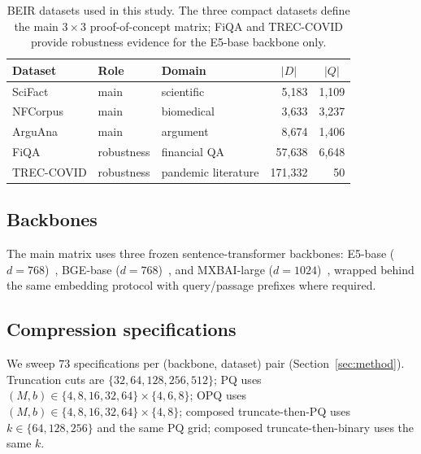 \documentclass[sigconf]{acmart}
\begin{document}
\begin{table}[t]
\centering
\small
\caption{BEIR datasets used in this study. The three compact datasets define the main 3\,$\times$\,3 proof-of-concept matrix; FiQA and TREC-COVID provide robustness evidence for the E5-base backbone only.}
\label{tab:datasets}
\begin{tabular}{lllrr}
\toprule
Dataset & Role & Domain & \multicolumn{1}{c}{$|D|$} & \multicolumn{1}{c}{$|Q|$} \\
\midrule
SciFact     & main       & scientific          & 5{,}183   & 1{,}109 \\
NFCorpus    & main       & biomedical          & 3{,}633   & 3{,}237 \\
ArguAna     & main       & argument            & 8{,}674   & 1{,}406 \\
\midrule
FiQA        & robustness & financial QA        & 57{,}638  & 6{,}648 \\
TREC-COVID  & robustness & pandemic literature & 171{,}332 & 50      \\
\bottomrule
\end{tabular}
\end{table}

\subsection{Backbones}
The main matrix uses three frozen sentence-transformer backbones: E5-base ($d{=}768$)~\cite{wang2022e5}, BGE-base ($d{=}768$)~\cite{xiao2023cpack}, and MXBAI-large ($d{=}1024$)~\cite{mxbai2024embed}, wrapped behind the same embedding protocol with query/passage prefixes where required.

\subsection{Compression specifications}
We sweep $73$ specifications per (backbone, dataset) pair (Section~\ref{sec:method}). Truncation cuts are $\{32, 64, 128, 256, 512\}$; PQ uses $(M, b) \in \{4, 8, 16, 32, 64\} \times \{4, 6, 8\}$; OPQ uses $(M, b) \in \{4, 8, 16, 32, 64\} \times \{4, 8\}$; composed truncate-then-PQ uses $k \in \{64, 128, 256\}$ and the same PQ grid; composed truncate-then-binary uses the same $k$.
\end{document}
